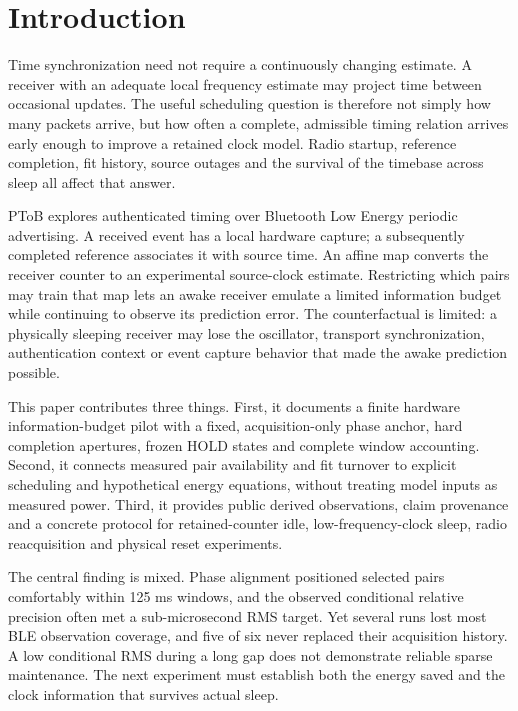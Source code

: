 \documentclass[11pt,letterpaper]{article}
\begin{document}
\section{Introduction}
Time synchronization need not require a continuously changing estimate. A receiver with an adequate local frequency estimate may project time between occasional updates. The useful scheduling question is therefore not simply how many packets arrive, but how often a complete, admissible timing relation arrives early enough to improve a retained clock model. Radio startup, reference completion, fit history, source outages and the survival of the timebase across sleep all affect that answer.

PToB explores authenticated timing over Bluetooth Low Energy periodic advertising. A received event has a local hardware capture; a subsequently completed reference associates it with source time. An affine map converts the receiver counter to an experimental source-clock estimate. Restricting which pairs may train that map lets an awake receiver emulate a limited information budget while continuing to observe its prediction error. The counterfactual is limited: a physically sleeping receiver may lose the oscillator, transport synchronization, authentication context or event capture behavior that made the awake prediction possible.

This paper contributes three things. First, it documents a finite hardware information-budget pilot with a fixed, acquisition-only phase anchor, hard completion apertures, frozen HOLD states and complete window accounting. Second, it connects measured pair availability and fit turnover to explicit scheduling and hypothetical energy equations, without treating model inputs as measured power. Third, it provides public derived observations, claim provenance and a concrete protocol for retained-counter idle, low-frequency-clock sleep, radio reacquisition and physical reset experiments.

The central finding is mixed. Phase alignment positioned selected pairs comfortably within 125 ms windows, and the observed conditional relative precision often met a sub-microsecond RMS target. Yet several runs lost most BLE observation coverage, and five of six never replaced their acquisition history. A low conditional RMS during a long gap does not demonstrate reliable sparse maintenance. The next experiment must establish both the energy saved and the clock information that survives actual sleep.
\end{document}
